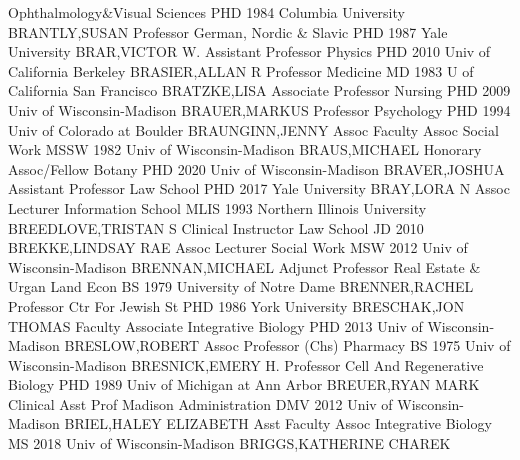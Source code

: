 \documentclass[
]{article}
\begin{document}
\textbar Ophthalmology\&Visual Sciences \textbar{} 
\textbar PHD 1984 Columbia University \textbar BRANTLY,SUSAN
\textbar Professor \textbar German, Nordic \& Slavic \textbar{}
 \textbar PHD 1987 Yale University \textbar BRAR,VICTOR W.
\textbar Assistant Professor \textbar Physics \textbar{} 
\textbar PHD 2010 Univ of California Berkeley \textbar BRASIER,ALLAN R
\textbar Professor \textbar Medicine \textbar{}  \textbar MD
1983 U of California San Francisco \textbar BRATZKE,LISA
\textbar Associate Professor \textbar Nursing \textbar{} 
\textbar PHD 2009 Univ of Wisconsin-Madison \textbar BRAUER,MARKUS
\textbar Professor \textbar Psychology \textbar{} 
\textbar PHD 1994 Univ of Colorado at Boulder \textbar BRAUNGINN,JENNY
\textbar Assoc Faculty Assoc \textbar Social Work \textbar{} 
\textbar MSSW 1982 Univ of Wisconsin-Madison \textbar BRAUS,MICHAEL
\textbar Honorary Assoc/Fellow \textbar Botany \textbar{} 
\textbar PHD 2020 Univ of Wisconsin-Madison \textbar BRAVER,JOSHUA
\textbar Assistant Professor \textbar Law School \textbar{} 
\textbar PHD 2017 Yale University \textbar BRAY,LORA N \textbar Assoc
Lecturer \textbar Information School \textbar{} 
\textbar MLIS 1993 Northern Illinois University
\textbar BREEDLOVE,TRISTAN S \textbar Clinical Instructor \textbar Law
School \textbar{}  \textbar JD 2010 \textbar BREKKE,LINDSAY
RAE \textbar Assoc Lecturer \textbar Social Work \textbar{} 
\textbar MSW 2012 Univ of Wisconsin-Madison \textbar BRENNAN,MICHAEL
\textbar Adjunct Professor \textbar Real Estate \& Urgan Land Econ
\textbar{}  \textbar BS 1979 University of Notre Dame
\textbar BRENNER,RACHEL \textbar Professor \textbar Ctr For Jewish St
\textbar{}  \textbar PHD 1986 York University
\textbar BRESCHAK,JON THOMAS \textbar Faculty Associate
\textbar Integrative Biology \textbar{}  \textbar PHD 2013
Univ of Wisconsin-Madison \textbar BRESLOW,ROBERT \textbar Assoc
Professor (Chs) \textbar Pharmacy \textbar{}  \textbar BS
1975 Univ of Wisconsin-Madison \textbar BRESNICK,EMERY H.
\textbar Professor \textbar Cell And Regenerative Biology \textbar{}
 \textbar PHD 1989 Univ of Michigan at Ann Arbor
\textbar BREUER,RYAN MARK \textbar Clinical Asst Prof \textbar Madison
Administration \textbar{}  \textbar DMV 2012 Univ of
Wisconsin-Madison \textbar BRIEL,HALEY ELIZABETH \textbar Asst Faculty
Assoc \textbar Integrative Biology \textbar{}  \textbar MS
2018 Univ of Wisconsin-Madison \textbar BRIGGS,KATHERINE CHAREK
\end{document}
